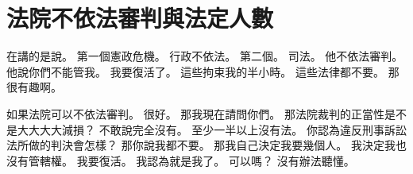 \section{法院不依法審判與法定人數}

\hypertarget{w01:cue:2135}{}在講的是說。
\hypertarget{w01:cue:2136}{}第一個憲政危機。
\hypertarget{w01:cue:2137}{}行政不依法。
\hypertarget{w01:cue:2138}{}第二個。
\hypertarget{w01:cue:2139}{}司法。
\hypertarget{w01:cue:2140}{}他不依法審判。
\hypertarget{w01:cue:2141}{}他說你們不能管我。
\hypertarget{w01:cue:2142}{}我要復活了。
\hypertarget{w01:cue:2143}{}這些拘束我的半小時。
\hypertarget{w01:cue:2144}{}這些法律都不要。
\hypertarget{w01:cue:2145}{}那很有趣啊。

\hypertarget{w01:cue:2146}{}如果法院可以不依法審判。
\hypertarget{w01:cue:2147}{}很好。
\hypertarget{w01:cue:2148}{}那我現在請問你們。
\hypertarget{w01:cue:2149}{}那法院裁判的正當性是不是大大大大減損？
\hypertarget{w01:cue:2150}{}不敢說完全沒有。
\hypertarget{w01:cue:2151}{}至少一半以上沒有法。
\hypertarget{w01:cue:2152}{}你認為違反刑事訴訟法所做的判決會怎樣？
\hypertarget{w01:cue:2153}{}那你說我都不要。
\hypertarget{w01:cue:2154}{}那我自己決定我要幾個人。
\hypertarget{w01:cue:2155}{}我決定我也沒有管轄權。
\hypertarget{w01:cue:2156}{}我要復活。
\hypertarget{w01:cue:2157}{}我認為就是我了。
\hypertarget{w01:cue:2158}{}可以嗎？
\hypertarget{w01:cue:2159}{}沒有辦法聽懂。

